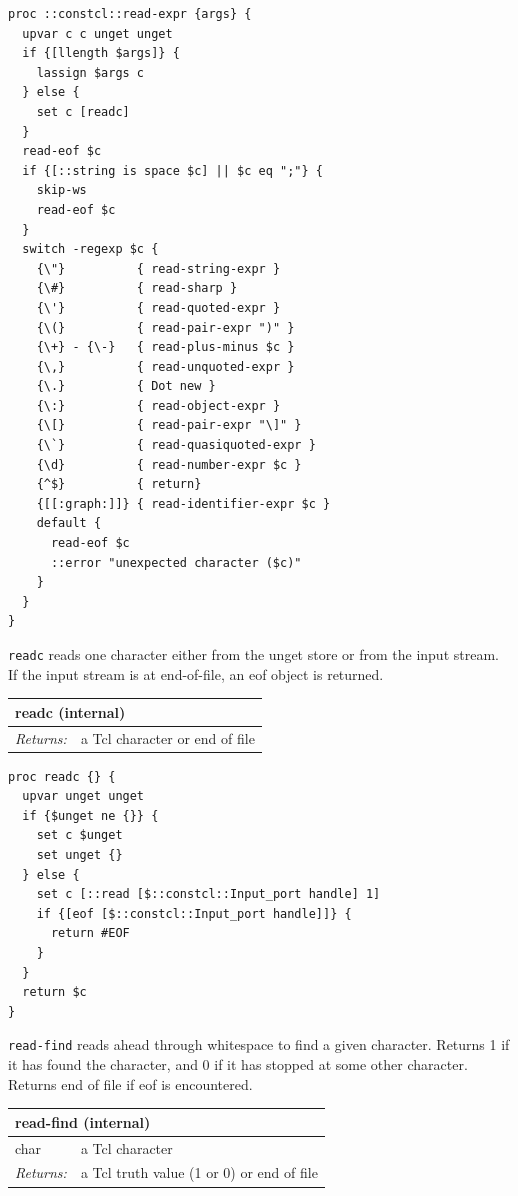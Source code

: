 \documentclass[twoside,9pt]{report}
\begin{document}
\noindent\makebox[\linewidth]{\rule{\linewidth}{0.4pt}}
\begin{lstlisting}
proc ::constcl::read-expr {args} {
  upvar c c unget unget
  if {[llength $args]} {
    lassign $args c
  } else {
    set c [readc]
  }
  read-eof $c
  if {[::string is space $c] || $c eq ";"} {
    skip-ws
    read-eof $c
  }
  switch -regexp $c {
    {\"}          { read-string-expr }
    {\#}          { read-sharp }
    {\'}          { read-quoted-expr }
    {\(}          { read-pair-expr ")" }
    {\+} - {\-}   { read-plus-minus $c }
    {\,}          { read-unquoted-expr }
    {\.}          { Dot new }
    {\:}          { read-object-expr }
    {\[}          { read-pair-expr "\]" }
    {\`}          { read-quasiquoted-expr }
    {\d}          { read-number-expr $c }
    {^$}          { return}
    {[[:graph:]]} { read-identifier-expr $c }
    default {
      read-eof $c
      ::error "unexpected character ($c)"
    }
  }
}
\end{lstlisting}
\noindent\makebox[\linewidth]{\rule{\linewidth}{0.4pt}}

\texttt{readc} reads one character either from the unget store or from the input stream. If the input stream is at end-of-file, an eof object is returned.

\begin{tabular}{ |l l| }
\hline
\multicolumn{2}{|l|}{readc (internal)} \\
\hline
\textit{Returns:} & a Tcl character or end of file \\
\hline
\end{tabular}

\noindent\makebox[\linewidth]{\rule{\linewidth}{0.4pt}}
\begin{lstlisting}
proc readc {} {
  upvar unget unget
  if {$unget ne {}} {
    set c $unget
    set unget {}
  } else {
    set c [::read [$::constcl::Input_port handle] 1]
    if {[eof [$::constcl::Input_port handle]]} {
      return #EOF
    }
  }
  return $c
}
\end{lstlisting}
\noindent\makebox[\linewidth]{\rule{\linewidth}{0.4pt}}

\texttt{read-find} reads ahead through whitespace to find a given character. Returns 1 if it has found the character, and 0 if it has stopped at some other character. Returns end of file if eof is encountered.

\begin{tabular}{ |l l| }
\hline
\multicolumn{2}{|l|}{read-find (internal)} \\
\hline
char & a Tcl character \\
\textit{Returns:} & a Tcl truth value (1 or 0) or end of file \\
\hline
\end{tabular}
\end{document}
